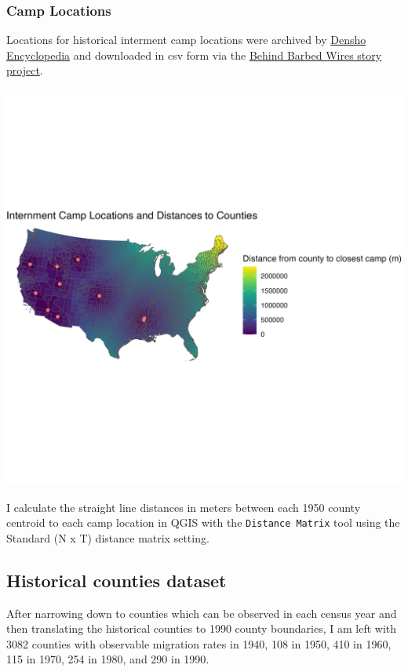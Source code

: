 \documentclass[12pt]{article}
\begin{document}

\subsubsection{Camp Locations}\label{camp-locations}

Locations for historical interment camp locations were archived by
\href{http://encyclopedia.densho.org/War_Relocation_Authority/\#Planning_the_Camps}{Densho
Encyclopedia} and downloaded in csv form via the
\href{https://www.arcgis.com/home/item.html?id=69183af8d45d4f46a9dc4eba99440891}{Behind
Barbed Wires story project}.

\includegraphics[width=1.0\textwidth]{figures/countymap.png}

I calculate the straight line distances in meters between each 1950
county centroid to each camp location in QGIS with the
\texttt{Distance\ Matrix} tool using the Standard (N x T) distance
matrix setting.

\subsection{Historical counties
dataset}\label{historical-counties-dataset}

After narrowing down to counties which can be observed in each census
year and then translating the historical counties to 1990 county
boundaries, I am left with 3082 counties with observable migration rates
in 1940, 108 in 1950, 410 in 1960, 115 in 1970, 254 in 1980, and 290 in
1990.
\end{document}
